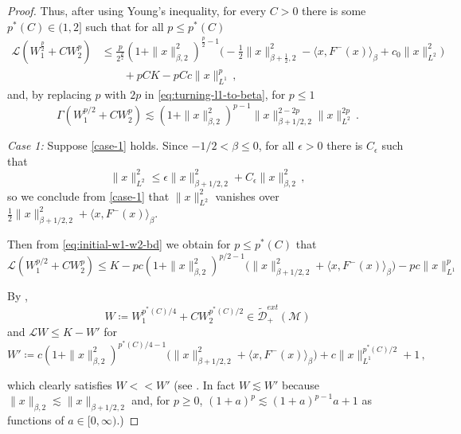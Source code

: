 \documentclass[final]{amsart}
\numberwithin{thm}{section}
\numberwithin{equation}{section}
\newcommand{\mcM}{\mathcal{M}}
\newcommand{\tDme}{\tilde{\mathcal{D}}^{ext}}
\newcommand{\Ll}{\mathcal{L}}
\newcommand{\ip}[2]{\langle #1, #2 \rangle}
\begin{document}
\begin{proof}
Thus, after using Young's inequality, for every $C > 0$ there is some $p^*(C) \in (1,2]$ such that for all $p \leq p^*(C)$
\begin{equation}\label{eq:initial-w1-w2-bd}
    \begin{aligned}
    \Ll (W_1^{\frac{p}{2}} + CW_2^p) &\leq \frac{p}{2^{\frac{p}{2}}}(1+\|x\|_{\beta,2}^2)^{\frac{p}{2}-1}\Big(-\frac{1}{2}\|x\|_{\beta+\frac{1}{2},2}^2 - \ip{x}{F^-(x)}_\beta +c_0\|x\|_{L^2}^2\Big) \\
    &\qquad + pCK - pCc\|x\|_{L^1}^p \,,
    \end{aligned}
\end{equation}
and, by replacing $p$ with $2p$ in \eqref{eq:turning-l1-to-beta}, for $p \leq 1$
\begin{equation}\label{eq:gamma-w1-w2-bd}
    \Gamma(W_1^{p/2} + CW_2^p) \lesssim (1+\|x\|_{\beta,2}^2)^{p-1}\|x\|_{\beta+1/2,2}^{2-2p}\|x\|_{L^2}^{2p} \,.
\end{equation}

\textit{Case 1:}
Suppose \ref{case-1} holds. Since $-1/2 < \beta \leq 0$, for all $\epsilon > 0$ there is $C_\epsilon$ such that
\begin{equation}\label{eq:ibbabh}
\|x\|_{L^2}^2 \leq \epsilon \|x\|_{\beta+1/2,2}^2 + C_\epsilon \|x\|_{\beta,2}^2 \,,    
\end{equation}
so we conclude from \ref{case-1} that $\|x\|_{L^2}^2$ vanishes over $\frac{1}{2}\|x\|_{\beta+1/2,2}^2 + \ip{x}{F^-(x)}_\beta$.

Then from \eqref{eq:initial-w1-w2-bd} we obtain for $p \leq p^*(C)$ that
\begin{equation*}
    \Ll (W_1^{p/2} + CW_2^p) \leq K -pc(1+\|x\|_{\beta,2}^2)^{p/2-1}\Big(\|x\|_{\beta+1/2,2}^2 + \ip{x}{F^-(x)}_\beta\Big) - pc\|x\|_{L^1}^p
\end{equation*}

By ,  
$$W \coloneqq W_1^{p^*(C)/4} + CW_2^{p^*(C)/2} \in \tDme_+(\mcM)$$
and $\Ll W \leq K - W'$ for
\begin{equation}\label{eq:def-of-w'-case-1}
    W' \coloneqq c(1+\|x\|_{\beta,2}^2)^{p^*(C)/4-1}\Big(\|x\|_{\beta+1/2,2}^2+ \ip{x}{F^-(x)}_\beta\Big)  + c\|x\|_{L^1}^{p^*(C)/2}  + 1 \,,
\end{equation}

which clearly satisfies $W << W'$ (see \Cref{<<}. In fact $W \lesssim W'$ because $\|x\|_{\beta,2} \lesssim \|x\|_{\beta+1/2,2}$ and, for $p \geq 0$, $(1+a)^p \lesssim (1+a)^{p-1}a + 1$ as functions of $a \in [0,\infty)$.)


\end{proof}
\end{document}
